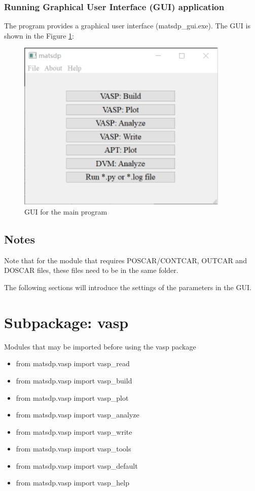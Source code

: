 \documentclass[12pt]{book}
\begin{document}
\subsection{Running Graphical User Interface (GUI) application}
The program provides a graphical user interface (matsdp\_gui.exe). The GUI is shown in the Figure \ref{fig:GUI_Main}:

\begin{figure}[htbp]
\centering
\includegraphics[width=0.9\textwidth]{gui_matsdp.pdf}
\caption{GUI for the main program}
\label{fig:GUI_Main}
\end{figure}

\section{Notes}

Note that for the module that requires POSCAR/CONTCAR, OUTCAR and DOSCAR files, these files need to be in the same folder.

The following sections will introduce the settings of the parameters in the GUI. 

\chapter{Subpackage: vasp}

Modules that may be imported before using the vasp package
\begin{itemize}
\item from matsdp.vasp import vasp\_read
\item from matsdp.vasp import vasp\_build
\item from matsdp.vasp import vasp\_plot
\item from matsdp.vasp import vasp\_analyze
\item from matsdp.vasp import vasp\_write
\item from matsdp.vasp import vasp\_tools
\item from matsdp.vasp import vasp\_default
\item from matsdp.vasp import vasp\_help
\end{itemize}
\end{document}
